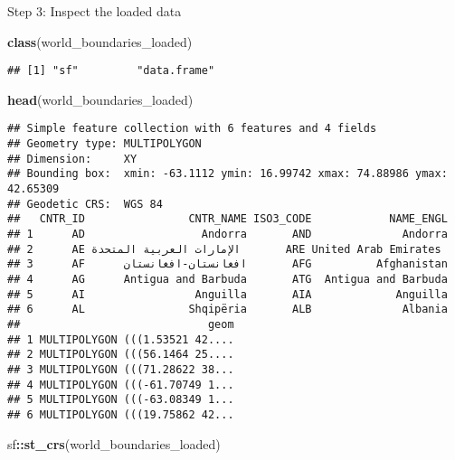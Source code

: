 \documentclass[
]{article}
\newenvironment{Shaded}{\begin{snugshade}}{\end{snugshade}}
\newcommand{\FunctionTok}[1]{\textcolor[rgb]{0.13,0.29,0.53}{\textbf{#1}}}
\newcommand{\NormalTok}[1]{#1}
\newcommand{\SpecialCharTok}[1]{\textcolor[rgb]{0.81,0.36,0.00}{\textbf{#1}}}
\begin{document}
Step 3: Inspect the loaded data

\begin{Shaded}
\begin{Highlighting}[]
\FunctionTok{class}\NormalTok{(world\_boundaries\_loaded)}
\end{Highlighting}
\end{Shaded}

\begin{verbatim}
## [1] "sf"         "data.frame"
\end{verbatim}

\begin{Shaded}
\begin{Highlighting}[]
\FunctionTok{head}\NormalTok{(world\_boundaries\_loaded)}
\end{Highlighting}
\end{Shaded}

\begin{verbatim}
## Simple feature collection with 6 features and 4 fields
## Geometry type: MULTIPOLYGON
## Dimension:     XY
## Bounding box:  xmin: -63.1112 ymin: 16.99742 xmax: 74.88986 ymax: 42.65309
## Geodetic CRS:  WGS 84
##   CNTR_ID                CNTR_NAME ISO3_CODE            NAME_ENGL
## 1      AD                  Andorra       AND              Andorra
## 2      AE الإمارات العربية المتحدة       ARE United Arab Emirates
## 3      AF      افغانستان-افغانستان       AFG          Afghanistan
## 4      AG      Antigua and Barbuda       ATG  Antigua and Barbuda
## 5      AI                 Anguilla       AIA             Anguilla
## 6      AL                Shqipëria       ALB              Albania
##                             geom
## 1 MULTIPOLYGON (((1.53521 42....
## 2 MULTIPOLYGON (((56.1464 25....
## 3 MULTIPOLYGON (((71.28622 38...
## 4 MULTIPOLYGON (((-61.70749 1...
## 5 MULTIPOLYGON (((-63.08349 1...
## 6 MULTIPOLYGON (((19.75862 42...
\end{verbatim}

\begin{Shaded}
\begin{Highlighting}[]
\NormalTok{sf}\SpecialCharTok{::}\FunctionTok{st\_crs}\NormalTok{(world\_boundaries\_loaded)}
\end{Highlighting}
\end{Shaded}
\end{document}
